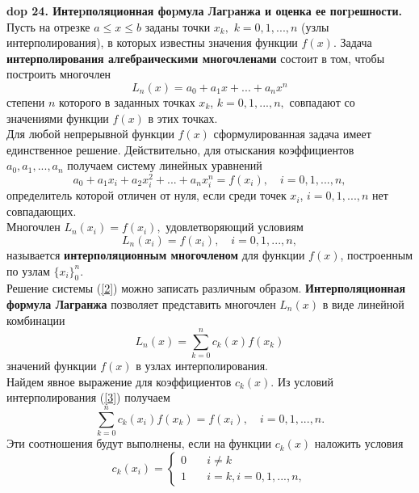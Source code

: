\textbf{\LARGE dop 24. Интеpполяционная фоpмула Лагpанжа и оценка ее погpешности.}  \\

Пусть на отрезке $a \leq x \leq b$ заданы точки $x_k,$ $k=0,1,...,n$ (узлы интерполирования), в которых известны значения функции $f(x)$. Задача \textbf{интерполирования алгебраическими многочленами} состоит в том, чтобы построить многочлен
\begin{equation}
    L_n(x)=a_0+a_1x+...+a_nx^n
\end{equation}
степени $n$ которого в заданных точках $x_k$, $k=0,1,...,n,$ совпадают со значениями функции $f(x)$ в этих точках. \\
Для любой непрерывной функции $f(x)$ сформулированная задача имеет единственное решение. Действительно, для отыскания коэффициентов $a_0, a_1, ...,a_n$ получаем систему линейных уравнений 
\begin{equation} \label{2}
    a_0 + a_1x_i+a_2x_i^2+...+a_nx_i^n=f(x_i), \quad i =0,1,...,n,
\end{equation}
определитель которой отличен от нуля, если среди точек $x_i$, $i=0,1,...,n$ нет совпадающих. \\
Многочлен $L_n(x_i)=f(x_i),$ удовлетворяющий условиям
\begin{equation} \label{3}
    L_n(x_i)=f(x_i), \quad i =0,1,...,n,
\end{equation}
называется \textbf{интерполяционным многочленом} для функции $f(x)$, построенным по узлам $\{x_i\}_0^n$. \\
Решение системы (\ref{2}) можно записать различным образом. \textbf{Интерполяционная формула Лагранжа} позволяет представить многочлен $L_n(x)$  в виде линейной комбинации 
\begin{equation} \label{4}
    L_n(x) = \sum_{k=0}^{n} c_k(x) f(x_k)
\end{equation}
значений функции $f(x)$ в узлах интерполирования. \\
Найдем явное выражение для коэффициентов $c_k(x)$. Из условий интерполирования (\ref{3}) получаем 
\begin{equation*} 
    \sum_{k=0}^{n} c_k(x_i) f(x_k) = f(x_i), \quad i=0,1,...,n.
\end{equation*}
Эти соотношения будут выполнены, если на функции $c_k(x)$ наложить условия
\begin{equation*}
    c_k(x_i) = 
    \begin{cases}
    0       & \quad i \neq k\\
    1  & \quad i = k, i =0,1,...,n,
  \end{cases}
\end{equation*}
